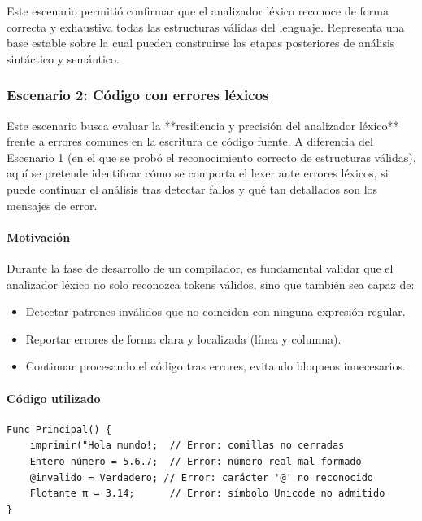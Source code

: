 \documentclass{article}
\begin{document}
Este escenario permitió confirmar que el analizador léxico reconoce de forma correcta y exhaustiva todas las estructuras válidas del lenguaje. Representa una base estable sobre la cual pueden construirse las etapas posteriores de análisis sintáctico y semántico.


\subsubsection{Escenario 2: Código con errores léxicos}

Este escenario busca evaluar la **resiliencia y precisión del analizador léxico** frente a errores comunes en la escritura de código fuente. A diferencia del Escenario 1 (en el que se probó el reconocimiento correcto de estructuras válidas), aquí se pretende identificar cómo se comporta el lexer ante errores léxicos, si puede continuar el análisis tras detectar fallos y qué tan detallados son los mensajes de error.

\paragraph{Motivación}

Durante la fase de desarrollo de un compilador, es fundamental validar que el analizador léxico no solo reconozca tokens válidos, sino que también sea capaz de:

\begin{itemize}
  \item Detectar patrones inválidos que no coinciden con ninguna expresión regular.
  \item Reportar errores de forma clara y localizada (línea y columna).
  \item Continuar procesando el código tras errores, evitando bloqueos innecesarios.
\end{itemize}

\paragraph{Código utilizado}

\begin{lstlisting}[style=mypython, caption={Fragmento con errores léxicos intencionados}]
Func Principal() {
    imprimir("Hola mundo!;  // Error: comillas no cerradas
    Entero número = 5.6.7;  // Error: número real mal formado
    @invalido = Verdadero; // Error: carácter '@' no reconocido
    Flotante π = 3.14;      // Error: símbolo Unicode no admitido
}
\end{lstlisting}
\end{document}
